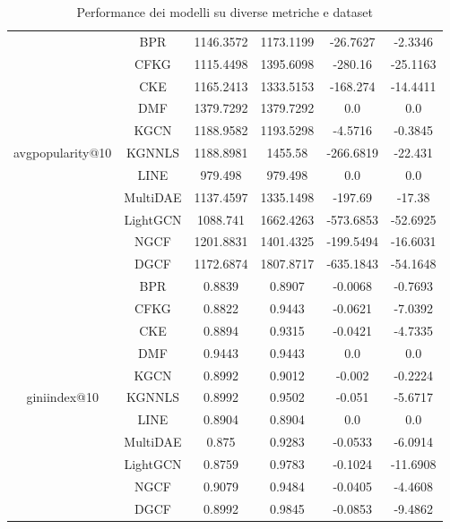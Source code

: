 \begin{table}[H]
{\begin{tabular}{|c|c|c|c|c|c|}
        \multirow{11}{*}{avgpopularity@10} 
            & BPR & 1146.3572 & 1173.1199 & -26.7627 & -2.3346 \\ \cline{2-6} 
            & CFKG & 1115.4498 & 1395.6098 & -280.16 & -25.1163 \\ \cline{2-6} 
            & CKE & 1165.2413 & 1333.5153 & -168.274 & -14.4411 \\ \cline{2-6} 
            & DMF & 1379.7292 & 1379.7292 & 0.0 & 0.0 \\ \cline{2-6} 
            & KGCN & 1188.9582 & 1193.5298 & -4.5716 & -0.3845 \\ \cline{2-6} 
            & KGNNLS & 1188.8981 & 1455.58 & -266.6819 & -22.431 \\ \cline{2-6} 
            & LINE & 979.498 & 979.498 & 0.0 & 0.0 \\ \cline{2-6} 
            & MultiDAE & 1137.4597 & 1335.1498 & -197.69 & -17.38 \\ \cline{2-6} 
            & LightGCN & 1088.741 & 1662.4263 & -573.6853 & -52.6925 \\ \cline{2-6} 
            & NGCF & 1201.8831 & 1401.4325 & -199.5494 & -16.6031 \\ \cline{2-6} 
            & DGCF & 1172.6874 & 1807.8717 & -635.1843 & -54.1648 \\ \hline

        \multirow{11}{*}{giniindex@10} 
            & BPR & 0.8839 & 0.8907 & -0.0068 & -0.7693 \\ \cline{2-6} 
            & CFKG & 0.8822 & 0.9443 & -0.0621 & -7.0392 \\ \cline{2-6} 
            & CKE & 0.8894 & 0.9315 & -0.0421 & -4.7335 \\ \cline{2-6} 
            & DMF & 0.9443 & 0.9443 & 0.0 & 0.0 \\ \cline{2-6} 
            & KGCN & 0.8992 & 0.9012 & -0.002 & -0.2224 \\ \cline{2-6} 
            & KGNNLS & 0.8992 & 0.9502 & -0.051 & -5.6717 \\ \cline{2-6} 
            & LINE & 0.8904 & 0.8904 & 0.0 & 0.0 \\ \cline{2-6} 
            & MultiDAE & 0.875 & 0.9283 & -0.0533 & -6.0914 \\ \cline{2-6} 
            & LightGCN & 0.8759 & 0.9783 & -0.1024 & -11.6908 \\ \cline{2-6} 
            & NGCF & 0.9079 & 0.9484 & -0.0405 & -4.4608 \\ \cline{2-6} 
            & DGCF & 0.8992 & 0.9845 & -0.0853 & -9.4862 \\ \hline
    \end{tabular}
    }
    \caption{Performance dei modelli su diverse metriche e dataset}
\end{table}

